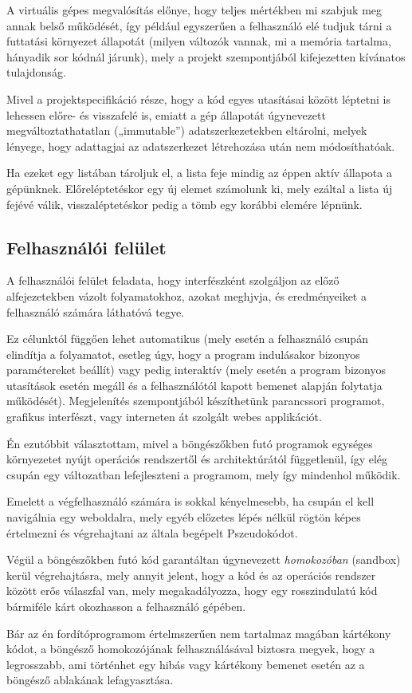 A virtuális gépes megvalósítás előnye, hogy teljes mértékben mi szabjuk meg annak belső működését, így például egyszerűen a felhasználó elé tudjuk tárni a futtatási környezet állapotát (milyen változók vannak, mi a memória tartalma, hányadik sor kódnál járunk), mely a projekt szempontjából kifejezetten kívánatos tulajdonság.

Mivel a projektspecifikáció része, hogy a kód egyes utasításai között léptetni is lehessen előre- és visszafelé is, emiatt a gép állapotát úgynevezett megváltoztathatatlan („immutable”) adatszerkezetekben eltárolni, melyek lényege, hogy adattagjai az adatszerkezet létrehozása után nem módosíthatóak. 

Ha ezeket egy listában tároljuk el, a lista feje mindig az éppen aktív állapota a gépünknek. Előreléptetéskor egy új elemet számolunk ki, mely ezáltal a lista új fejévé válik, visszaléptetéskor pedig a tömb egy korábbi elemére lépnünk.

\subsection{Felhasználói felület}

A felhasználói felület feladata, hogy interfészként szolgáljon az előző alfejezetekben vázolt folyamatokhoz, azokat meghjvja, és eredményeiket a felhasználó számára láthatóvá tegye.

Ez célunktól függően lehet automatikus (mely esetén a felhasználó csupán elindítja a folyamatot, esetleg úgy, hogy a program indulásakor bizonyos paramétereket beállít) vagy pedig interaktív (mely esetén a program bizonyos utasítások esetén megáll és a felhasználótól kapott bemenet alapján folytatja működését). Megjelenítés szempontjából készíthetünk parancssori programot, grafikus interfészt, vagy interneten át szolgált webes applikációt.

Én ezutóbbit választottam, mivel a böngészőkben futó programok egységes környezetet nyújt operációs rendszertől és architektúrától függetlenül, így elég csupán egy változatban lefejleszteni a programom, mely így mindenhol működik.

Emelett a végfelhasználó számára is sokkal kényelmesebb, ha csupán el kell navigálnia egy weboldalra, mely egyéb előzetes lépés nélkül rögtön képes értelmezni és végrehajtani az általa begépelt Pszeudokódot.

Végül a böngészőkben futó kód garantáltan úgynevezett \textit{homokozóban} (sandbox) kerül végrehajtásra, mely annyit jelent, hogy a kód és az operációs rendszer között erős válaszfal van, mely megakadályozza, hogy egy rosszindulatú kód bármiféle kárt okozhasson a felhasználó gépében.

Bár az én fordítóprogramom értelmszerűen nem tartalmaz magában kártékony kódot, a böngésző homokozójának felhasználásával biztosra megyek, hogy a legrosszabb, ami történhet egy hibás vagy kártékony bemenet esetén az a böngésző ablakának lefagyasztása.